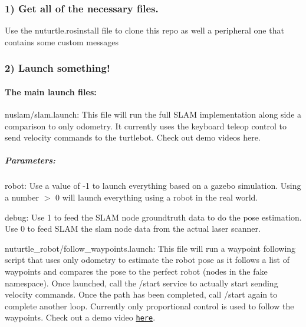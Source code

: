 \subsubsection*{1) Get all of the necessary files.}

Use the nuturtle.\+rosinstall file to clone this repo as well a peripheral one that contains some custom messages

\subsubsection*{2) Launch something!}

\paragraph*{The main launch files\+:}


\begin{DoxyItemize}
\item {\ttfamily nuslam/slam.\+launch}\+: This file will run the full S\+L\+AM implementation along side a comparison to only odometry. It currently uses the keyboard teleop control to send velocity commands to the turtlebot. Check out demo videos here.
\end{DoxyItemize}

\subparagraph*{Parameters\+:}


\begin{DoxyItemize}
\item robot\+: Use a value of -\/1 to launch everything based on a gazebo simulation. Using a number $>$ 0 will launch everything using a robot in the real world.
\item debug\+: Use 1 to feed the S\+L\+AM node groundtruth data to do the pose estimation. Use 0 to feed S\+L\+AM the slam node data from the actual laser scanner.
\end{DoxyItemize}

{\ttfamily nuturtle\+\_\+robot/follow\+\_\+waypoints.\+launch}\+: This file will run a waypoint following script that uses only odometry to estimate the robot pose as it follows a list of waypoints and compares the pose to the \textquotesingle{}perfect\textquotesingle{} robot (nodes in the {\ttfamily fake} namespace). Once launched, call the {\ttfamily /start} service to actually start sending velocity commands. Once the path has been completed, call {\ttfamily /start} again to complete another loop. Currently only proportional control is used to follow the waypoints. Check out a demo video \href{https://www.youtube.com/watch?v=V_Ljk7B5whE}{\tt here}.

